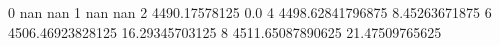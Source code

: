 0 nan nan
1 nan nan
2 4490.17578125 0.0
4 4498.62841796875 8.45263671875
6 4506.46923828125 16.29345703125
8 4511.65087890625 21.47509765625
